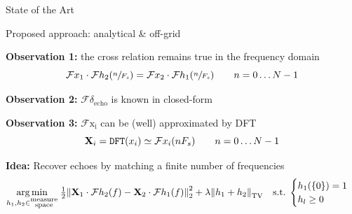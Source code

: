 \begin{frame}{State of the Art \hfill\faBook}
 \end{frame}


\begin{frame}{Proposed approach: analytical \& off-grid \hfill\faJediOrder}

    \begin{block}{\textbf{Observation 1:} the cross relation remains true in the frequency domain}
        \begin{equation*}
            \mathcal{F}x_1 \cdot \mathcal{F}h_2 (\sfrac{n}{F_s}) = \mathcal{F}x_2 \cdot \mathcal{F}h_1(\sfrac{n}{F_s}) \qquad n=0\dots N-1
        \end{equation*}
        \end{block}

        \vspace{.5em}

        \pause
        \begin{block}{\textbf{Observation 2:} $\mathcal{F}\delta_{\mathrm{echo}}$ is known in closed-form}
        \end{block}

        \pause
        \vspace{1.em}
        \begin{block}{\textbf{Observation 3:} $\mathcal{F}{\mathrm{x_i}}$ can be (well) approximated by DFT}
        \begin{equation*}
            \mathbf{X}_i = \texttt{DFT}(x_i) \simeq  \mathcal{F}{x_i}(nF_s) \qquad n=0\dots N-1
        \end{equation*}
        \end{block}


        \pause
        \vfill
        \begin{block}{\textbf{Idea:} Recover echoes by matching a finite number of frequencies}
        \begin{equation*}
            \underset{h_1,h_2 \in \substack{\text{measure} \\ \text{space}}}{\arg\min} \;
            \tfrac{1}{2} \kvvbar{
                \mathbf{X}_1 \cdot \mathcal{F}h_2 (f) - \mathbf{X}_2 \cdot \mathcal{F}h_1(f)
            }_2^2
            + \lambda \kvvbar{h_1 + h_2}_{\mathrm{TV}}
            \quad
            \text{s.t.}\;
            \begin{cases}
                h_1(\{0\})=1 \\
                h_l \geq 0
                \end{cases}
        \end{equation*}
        \end{block}


\end{frame}
